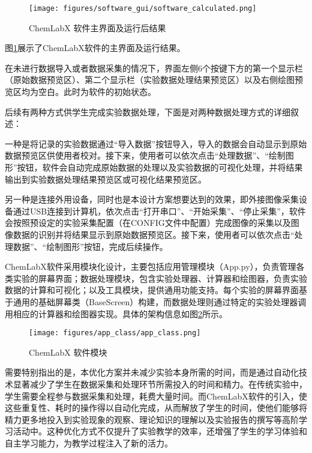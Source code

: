 \documentclass[UTF8,a4paper,fontset=none]{ctexart}
\begin{document}
\begin{figure}[H]
\centering
\texttt{[image: figures/software\_gui/software\_calculated.png]}
\caption{ChemLabX 软件主界面及运行后结果}
\label{fig:software_calculated}
\end{figure}

图\ref{fig:software_calculated}展示了ChemLabX软件的主界面及运行结果。

在未进行数据导入或者数据采集的情况下，界面左侧6个按键下方的第一个显示栏（原始数据预览区）、第二个显示栏（实验数据处理结果预览区）以及右侧绘图预览区均为空白。此时为软件的初始状态。

后续有两种方式供学生完成实验数据处理，下面是对两种数据处理方式的详细叙述：

一种是将记录的实验数据通过“导入数据”按钮导入，导入的数据会自动显示到原始数据预览区供使用者校对。接下来，使用者可以依次点击“处理数据”、“绘制图形”按钮，软件会自动完成原始数据的处理以及实验数据的可视化处理，并将结果输出到实验数据处理结果预览区或可视化结果预览区。

另一种是连接外用设备，同时也是本设计方案想要达到的效果，即外接图像采集设备通过USB连接到计算机，依次点击“打开串口”、“开始采集”、“停止采集”，软件会按照预设定的实验采集配置（在CONFIG文件中配置）完成图像的采集以及图像数据的识别并将结果显示到原始数据预览区。接下来，使用者可以依次点击“处理数据”、“绘制图形”按钮，完成后续操作。

ChemLabX软件采用模块化设计，主要包括应用管理模块（App.py），负责管理各类实验的屏幕界面；数据处理模块，包含实验处理器、计算器和绘图器，负责实验数据的计算和可视化；以及工具模块，提供通用功能支持。每个实验的屏幕界面基于通用的基础屏幕类（BaseScreen）构建，而数据处理则通过特定的实验处理器调用相应的计算器和绘图器实现。具体的架构信息如图\ref{fig:software_class}所示。

\begin{figure}[H]
\centering
\texttt{[image: figures/app\_class/app\_class.png]}
\caption{ChemLabX 软件模块}
\label{fig:software_class}
\end{figure}

需要特别指出的是，本优化方案并未减少实验本身所需的时间，而是通过自动化技术显著减少了学生在数据采集和处理环节所需投入的时间和精力。在传统实验中，学生需要全程参与数据采集和处理，耗费大量时间。而ChemLabX软件的引入，使这些重复性、耗时的操作得以自动化完成，从而解放了学生的时间，使他们能够将精力更多地投入到实验现象的观察、理论知识的理解以及实验报告的撰写等高阶学习活动中。这种优化方式不仅提升了实验教学的效率，还增强了学生的学习体验和自主学习能力，为教学过程注入了新的活力。
\end{document}
